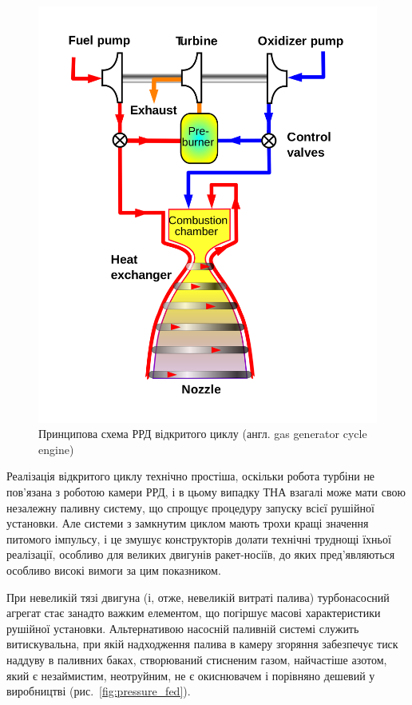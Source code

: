 \begin{figure}
    \centering
    \includegraphics[width=0.35\textheight, angle=0,origin=c]{chapter_1/Gas_generator_rocket_cycle.svg.png}
    \caption{Принципова схема РРД відкритого циклу (англ. gas generator cycle engine)}
    \label{fig:gas_generator}
\end{figure}

Реалізація відкритого циклу технічно простіша, оскільки робота турбіни не пов'язана з роботою камери РРД, і в цьому випадку ТНА взагалі може мати свою незалежну паливну систему, що спрощує процедуру запуску всієї рушійної установки. Але системи з замкнутим циклом мають трохи кращі значення питомого імпульсу, і це змушує конструкторів долати технічні труднощі їхньої реалізації, особливо для великих двигунів ракет-носіїв, до яких пред'являються особливо високі вимоги за цим показником.

При невеликій тязі двигуна (і, отже, невеликій витраті палива) турбонасосний агрегат стає занадто важким елементом, що погіршує масові характеристики рушійної установки. Альтернативою насосній паливній системі служить витискувальна, при якій надходження палива в камеру згоряння забезпечує тиск наддуву в паливних баках, створюваний стисненим газом, найчастіше азотом, який є незаймистим, неотруйним, не є окиснювачем і порівняно дешевий у виробництві (рис.~\ref{fig:pressure_fed}).

